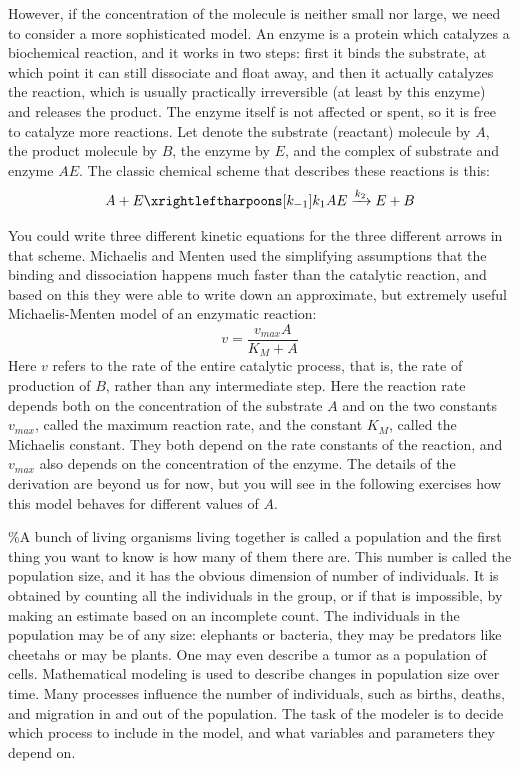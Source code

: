 \documentclass[
]{book}
\begin{document}
However, if the concentration of the molecule is neither small nor large, we need to consider a more sophisticated model. An enzyme is a protein which catalyzes a biochemical reaction, and it works in two steps: first it binds the substrate, at which point it can still dissociate and float away, and then it actually catalyzes the reaction, which is usually practically irreversible (at least by this enzyme) and releases the product. The enzyme itself is not affected or spent, so it is free to catalyze more reactions. Let denote the substrate (reactant) molecule by \(A\), the product molecule by \(B\), the enzyme by \(E\), and the complex of substrate and enzyme \(AE\). The classic chemical scheme that describes these reactions is this:
\[
A + E \xrightleftharpoons[k_{-1}]{k_1} AE  \xrightarrow{k_2} E + B
\]

You could write three different kinetic equations for the three different arrows in that scheme. Michaelis and Menten used the simplifying assumptions that the binding and dissociation happens much faster than the catalytic reaction, and based on this they were able to write down an approximate, but extremely useful Michaelis-Menten model of an enzymatic reaction:
\begin{equation}
v = \frac{v_{max} A}{K_M+A}
\label{eq:kinetics_MM_kinetics}
\end{equation}
Here \(v\) refers to the rate of the entire catalytic process, that is, the rate of production of \(B\), rather than any intermediate step. Here the reaction rate depends both on the concentration of the substrate \(A\) and on the two constants \(v_{max}\), called the maximum reaction rate, and the constant \(K_M\), called the Michaelis constant. They both depend on the rate constants of the reaction, and \(v_{max}\) also depends on the concentration of the enzyme. The details of the derivation are beyond us for now, but you will see in the following exercises how this model behaves for different values of \(A\).

\%A bunch of living organisms living together is called a population and the first thing you want to know is how many of them there are. This number is called the population size, and it has the obvious dimension of number of individuals. It is obtained by counting all the individuals in the group, or if that is impossible, by making an estimate based on an incomplete count. The individuals in the population may be of any size: elephants or bacteria, they may be predators like cheetahs or may be plants. One may even describe a tumor as a population of cells. Mathematical modeling is used to describe changes in population size over time. Many processes influence the number of individuals, such as births, deaths, and migration in and out of the population. The task of the modeler is to decide which process to include in the model, and what variables and parameters they depend on.
\end{document}
